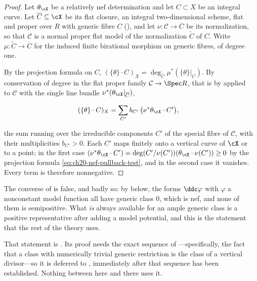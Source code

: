 \begin{proof}
Let \(\theta_{\cX}\) be a relatively nef determination and let \(C\subset X\)
be an integral curve.  Let \(\overline C\subseteq\cX\) be its flat closure,
an integral two-dimensional scheme, flat and proper over \(R\) with generic
fibre \(C\) (), and let
\(\nu:\mathcal C\to\overline C\) be its normalization, so that
\(\mathcal C\) is a normal proper flat model of the normalization
\(\widetilde C\) of \(C\).  Write \(\mu:\widetilde C\to C\) for the induced
finite birational morphism on generic fibres, of degree one.

By the projection formula on \(C\),
\((\{\theta\}\cdot C)_X=\deg_{\widetilde C}\mu^*(\{\theta\}|_C)\).  By
conservation of degree in the flat proper family
\(\mathcal C\to\Spec R\), that is by
 applied to \(\mathcal C\) with the single
line bundle \(\nu^*(\theta_{\cX}|_{\overline C})\),

\[
 (\{\theta\}\cdot C)_X
 =\sum_{C'}b_{C'}\,\bigl(\nu^*\theta_{\cX}\cdot C'\bigr),
\]

the sum running over the irreducible components \(C'\) of the special fibre
of \(\mathcal C\), with their multiplicities \(b_{C'}>0\).  Each \(C'\) maps
finitely onto a vertical curve of \(\cX\) or to a point; in the first case
\((\nu^*\theta_{\cX}\cdot C')=\deg(C'/\nu(C'))(\theta_{\cX}\cdot\nu(C'))\geq0\)
by the projection formula \eqref{eq:ch20-nef-pullback-test}, and in the
second case it vanishes.  Every term is therefore nonnegative.
\end{proof}

The converse of  is false, and
badly so: by  below, the forms
\(\ddc\varphi\) with \(\varphi\) a nonconstant model function all have
generic class \(0\), which is nef, and none of them is semipositive.  What
\emph{is} always available for an ample generic class is a positive
representative after adding a model potential, and this is the statement
that the rest of the theory uses.

That statement is .  Its proof needs
the exact sequence of ---specifically, the fact that a
class with numerically trivial generic restriction is the class of a
vertical divisor---so it is deferred to
, immediately after that sequence has
been established.  Nothing between here and there uses it.

